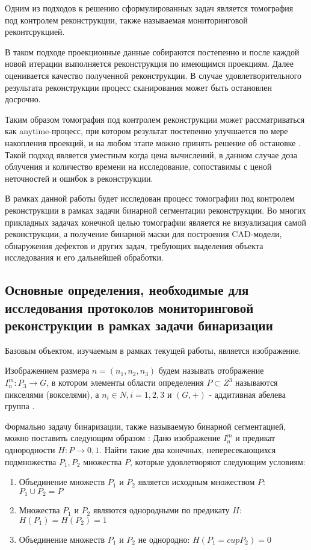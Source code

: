 Одним из подходов к решению сформулированных задач является томография под контролем реконструкции, также называемая мониторинговой реконтсрукцией. 

В таком подходе проекционные данные собираются постепенно и после каждой новой итерации выполняется реконструкция по имеющимся проекциям. Далее оценивается качество полученной реконструкции. В случае удовлетворительного результата реконструкции процесс сканирования может быть остановлен досрочно. 

Таким образом томография под контролем реконструкции может рассматриваться как anytime-процесс, при котором результат постепенно улучшается по мере накопления проекций, и на любом этапе можно принять решение об остановке \cite{bulatov2020monitored}. Такой подход является уместным когда цена вычислений, в данном случае доза облучения и количество времени на исследование, сопоставимы с ценой неточностей и ошибок в реконструкции.

В рамках данной работы будет исследован процесс томографии под контролем реконструкции в рамках задачи бинарной сегментации реконструкции. Во многих прикладных задачах конечной целью томографии является не визуализация самой реконструкции, а получение бинарной маски для построения CAD-модели, обнаружения дефектов и других задач, требующих выделения объекта исследования и его дальнейшей обработки.

\subsection{Основные определения, необходимые для исследования протоколов мониторинговой реконструкции в рамках задачи бинаризации}

Базовым объектом, изучаемым в рамках текущей работы, является изображение.

Изображением размера \(n=(n_1, n_2, n_3)\) будем называть отображение \(I_n^m : P_3 \rightarrow G\), в котором элементы области определения \(P \subset Z^3\)  называются пикселями (вокселями), а \(n_i \in N, i = 1, 2, 3\) и \((G, +)\) - аддитивная абелева группа \cite{NikolaevPhdthesis}.

Формально задачу бинаризации, также называемую бинарной сегментацией, можно поставить следующим образом \cite{fu1981survey}:
Дано изображение \( I_n^m \) и предикат однородности \(H : P \rightarrow {0, 1}\). Найти такие два конечных, непересекающихся подмножества \( P_1, P_2\) множества \(P\), которые удовлетворяют следующим условиям: 
\begin{enumerate}
    \item Объединение множеств \(P_1\) и \(P_2\) является исходным множеством \(P\): \( P_1 \cup  P_2 = P \) 
    \item Множества \(P_1\) и \(P_2\) являются однородными по предикату \(H\): \(H(P_1) = H(P_2) = 1\)
    \item Объединение множеств \(P_1\) и \(P_2\) не однородно: \(H(P_1 =cup P_2) = 0\)
\end{enumerate}

